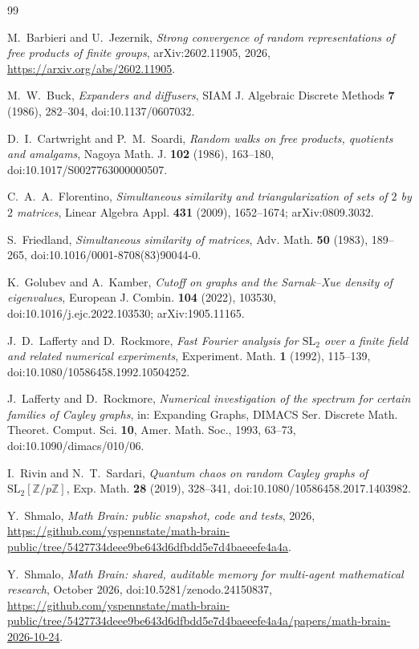 \documentclass[11pt,a4paper]{article}
\numberwithin{equation}{section}
\theoremstyle{remark}
\begin{document}
\begin{thebibliography}{99}

 M.~Barbieri and U.~Jezernik, \emph{Strong convergence of random representations of free products of finite groups}, arXiv:2602.11905, 2026, \url{https://arxiv.org/abs/2602.11905}.

 M.~W.~Buck, \emph{Expanders and diffusers}, SIAM J. Algebraic Discrete Methods \textbf{7} (1986), 282--304, doi:10.1137/0607032.

 D.~I.~Cartwright and P.~M.~Soardi, \emph{Random walks on free products, quotients and amalgams}, Nagoya Math. J. \textbf{102} (1986), 163--180, doi:10.1017/S0027763000000507.

 C.~A.~A.~Florentino, \emph{Simultaneous similarity and triangularization of sets of $2$ by $2$ matrices}, Linear Algebra Appl. \textbf{431} (2009), 1652--1674; arXiv:0809.3032.

 S.~Friedland, \emph{Simultaneous similarity of matrices}, Adv. Math. \textbf{50} (1983), 189--265, doi:10.1016/0001-8708(83)90044-0.

 K.~Golubev and A.~Kamber, \emph{Cutoff on graphs and the Sarnak--Xue density of eigenvalues}, European J. Combin. \textbf{104} (2022), 103530, doi:10.1016/j.ejc.2022.103530; arXiv:1905.11165.

 J.~D.~Lafferty and D.~Rockmore, \emph{Fast Fourier analysis for $\mathrm{SL}_2$ over a finite field and related numerical experiments}, Experiment. Math. \textbf{1} (1992), 115--139, doi:10.1080/10586458.1992.10504252.

 J.~Lafferty and D.~Rockmore, \emph{Numerical investigation of the spectrum for certain families of Cayley graphs}, in: Expanding Graphs, DIMACS Ser. Discrete Math. Theoret. Comput. Sci. \textbf{10}, Amer. Math. Soc., 1993, 63--73, doi:10.1090/dimacs/010/06.

 I.~Rivin and N.~T.~Sardari, \emph{Quantum chaos on random Cayley graphs of $\mathrm{SL}_2[\mathbb{Z}/p\mathbb{Z}]$}, Exp. Math. \textbf{28} (2019), 328--341, doi:10.1080/10586458.2017.1403982.

 Y.~Shmalo, \emph{Math Brain: public snapshot, code and tests}, 2026, \url{https://github.com/yspennstate/math-brain-public/tree/5427734deee9be643d6dfbdd5e7d4baeeefe4a4a}.

 Y.~Shmalo, \emph{Math Brain: shared, auditable memory for multi-agent mathematical research}, October 2026, doi:10.5281/zenodo.24150837, \url{https://github.com/yspennstate/math-brain-public/tree/5427734deee9be643d6dfbdd5e7d4baeeefe4a4a/papers/math-brain-2026-10-24}.


\end{thebibliography}
\end{document}
